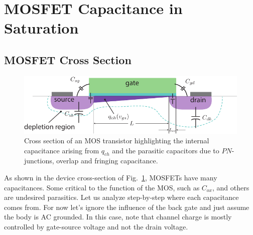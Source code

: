 \section{MOSFET Capacitance in Saturation}
\subsection{MOSFET Cross Section}
\begin{figure}[tb]
\centering
\includegraphics[width=.75\columnwidth]{mos_caps_xsect}
\caption{Cross section of an MOS transistor highlighting the internal capacitance arising from $q_{ch}$ and the parasitic capacitors due to $PN$-junctions, overlap and fringing capacitance.}
\label{fig:moscapsxsect}
\end{figure}
As shown in the device cross-section of Fig.~\ref{fig:moscapsxsect}, MOSFETs have many capacitances. Some critical to the function of the MOS, such as $C_{ox}$, and others are undesired parasitics.  Let us analyze step-by-step where each capacitance comes from.  For now let's ignore the influence of the back gate and just assume the body is AC grounded. In this case, note that channel charge is mostly controlled by gate-source voltage and not the drain voltage.  
